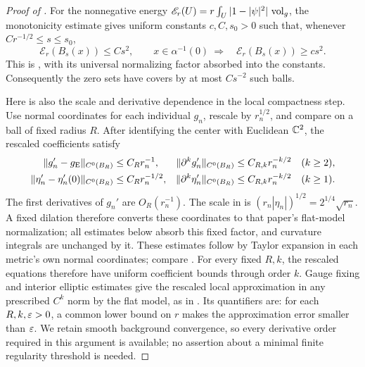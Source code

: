 \begin{proof}[Proof of ]
For the nonnegative energy
\(\mathscr E_r(U)=r\int_U|1-|\psi|^2|\,\operatorname{vol}_g\), the
monotonicity estimate gives uniform constants \(c,C,s_0>0\) such
that, whenever \(Cr^{-1/2}\le s\le s_0\),
\begin{equation}
 \label{eq:families-taubes-monotonicity}
 \mathscr E_r(B_s(x))\le Cs^2,
 \qquad
 x\in\alpha^{-1}(0)\ \Longrightarrow\quad
 \mathscr E_r(B_s(x))\ge cs^2.
\end{equation}
This is \cite[Proposition~4.1]{Taubes1999}, with its universal
normalizing factor absorbed into the constants.  Consequently the
zero sets have covers by at most \(Cs^{-2}\) such balls.

Here is also the scale and derivative dependence in the local
compactness step.  Use normal coordinates for each individual
\(g_n\), rescale by \(r_n^{1/2}\), and compare on a ball of fixed
radius \(R\).  After identifying the center with Euclidean
\(\mathbb C^2\), the rescaled coefficients satisfy
\begin{align}
 \label{eq:families-taubes-rescaling}
 \|g_n'-g_{\mathrm E}\|_{C^0(B_R)}&\le C_Rr_n^{-1},
 &\|\partial^kg_n'\|_{C^0(B_R)}&\le C_{R,k}r_n^{-k/2}
       &&(k\ge2),\\
 \|\eta_n'-\eta_n'(0)\|_{C^0(B_R)}&\le C_Rr_n^{-1/2},
 &\|\partial^k\eta_n'\|_{C^0(B_R)}&\le C_{R,k}r_n^{-k/2}
       &&(k\ge1).\notag
\end{align}
The first derivatives of \(g_n'\) are \(O_R(r_n^{-1})\).
The scale in \cite[Equation~(5.1)]{Taubes1999} is
\((r_n|\eta_n|)^{1/2}=2^{1/4}\sqrt{r_n}\).
A fixed dilation therefore converts these coordinates to that
paper's flat-model normalization; all estimates below absorb this
fixed factor, and curvature integrals are unchanged by it.
These estimates follow by Taylor expansion in each metric's own
normal coordinates; compare \cite[Section~6, Step~4]{Taubes1999}.
For every fixed \(R,k\), the rescaled equations therefore have
uniform coefficient bounds through order \(k\).  Gauge fixing and
interior elliptic estimates give the rescaled local approximation in
any prescribed \(C^k\) norm by the flat model, as in
\cite[Proposition~5.2]{Taubes1999}.  Its quantifiers are: for each
\(R,k,\varepsilon>0\), a common lower bound on \(r\) makes the
approximation error smaller than \(\varepsilon\).  We retain smooth
background convergence, so every derivative order required in this
argument is available; no assertion about a minimal finite
regularity threshold is needed.


\end{proof}
